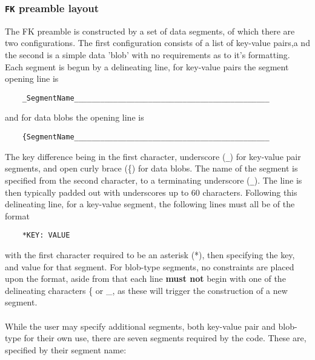 \documentclass[11pt]{article}
\begin{document}
\subsubsection*{{\tt FK} preamble layout}
The FK preamble is constructed by a set of data segments, of which there are two configurations. The first configuration consists of a list of key-value pairs,a nd the second is a simple data 'blob' with no requirements as to it's formatting. Each segment is begun by a delineating line, for key-value pairs the segment opening line is 
\begin{verbatim}
    _SegmentName_____________________________________________
\end{verbatim}
and for data blobs the opening line is
\begin{verbatim}
    {SegmentName_____________________________________________
\end{verbatim}
The key difference being in the first character, underscore ({\tt \_}) for key-value pair segments, and open curly brace (\{) for data blobs.
The name of the segment is specified from the second character, to a terminating underscore ({\tt \_}). The line is then typically padded out
with underscores up to 60 characters. Following this delineating line, for a key-value segment, the following lines must all be of the format
\begin{verbatim}
    *KEY: VALUE
\end{verbatim}
with the first character required to be an asterisk (*), then specifying the key, and value for that segment. For blob-type segments, no constraints are placed upon the format, aside from that each line \textbf{must not} begin with one of the delineating characters \{ or \_, as these will trigger the construction of a new segment.\\\\
While the user may specify additional segments, both key-value pair and blob-type for their own use, there are seven segments required by the code. 
These are, specified by their segment name:
\end{document}
